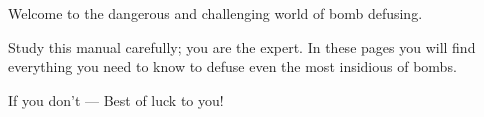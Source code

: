 Welcome to the dangerous and challenging world of bomb defusing.\par
Study this manual carefully; you are the expert.
In these pages you will find everything you need to know to defuse even the most insidious of bombs.\par
If you don’t — Best of luck to you!
